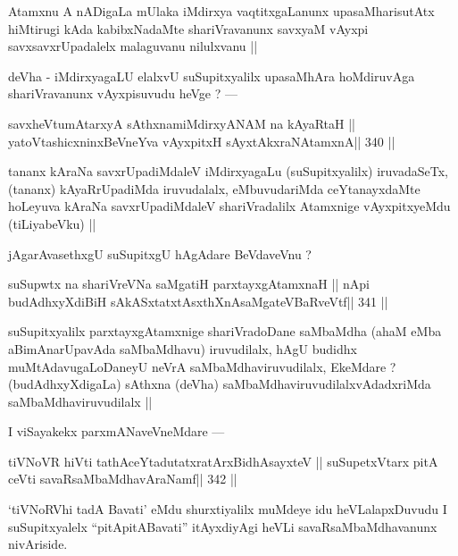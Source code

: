 \begin{artha}
Atamxnu A nADigaLa mUlaka iMdirxya vaqtitxgaLanunx upasaMharisutAtx 
hiMtirugi kAda kabibxNadaMte shariVravanunx savxyaM vAyxpi savxsavxrUpadalelx malaguvanu nilulxvanu ||
\end{artha}

\begin{artha}
deVha - iMdirxyagaLU elalxvU suSupitxyalilx upasaMhAra hoMdiruvAga shariVravanunx vAyxpisuvudu heVge ? ---
\end{artha}

\begin{shl}
savxheVtumAtarxyA sAthxnamiMdirxyANAM na kAyaRtaH ||
yatoV\s tashicxninxBeVneYva vAyxpitxH sAyxtAkxraNAtamxnA\hfill || 340 ||
\end{shl}

\begin{artha}
tananx kAraNa savxrUpadiMdaleV iMdirxyagaLu (suSupitxyalilx) 
iruvadaSeTx, (tananx) kAyaRrUpadiMda iruvudalalx, eMbuvudariMda ceYtanayxdaMte hoLeyuva kAraNa savxrUpadiMdaleV shariVradalilx Atamxnige vAyxpitxyeMdu (tiLiyabeVku) ||
\end{artha}

\begin{artha}
jAgarAvasethxgU suSupitxgU hAgAdare BeVdaveVnu ?
\end{artha}

\begin{shl}
suSupwtx na shariVreVNa saMgatiH parxtayxgAtamxnaH ||
nApi budAdhxyXdiBiH sAkASxtatxtAsxthXnAsaMgateVBaRveVtf\hfill || 341 ||
\end{shl}

\begin{artha}
suSupitxyalilx parxtayxgAtamxnige shariVradoDane saMbaMdha (ahaM eMba 
aBimAnarUpavAda saMbaMdhavu) iruvudilalx, hAgU budidhx 
muMtAdavugaLoDaneyU neVrA saMbaMdhaviruvudilalx, EkeMdare ? (budAdhxyXdigaLa) sAthxna (deVha) saMbaMdhaviruvudilalxvAdadxriMda saMbaMdhaviruvudilalx ||
\end{artha}

\begin{artha}
I viSayakekx parxmANaveVneMdare ---
\end{artha}

\begin{shl}
tiVNoVR hiVti tathAceYtadutatxratArxBidhAsayxteV ||
suSupetxV\s tarx pitA ceVti savaRsaMbaMdhavAraNamf\hfill || 342 ||
\end{shl}

\begin{artha}
`tiVNoRVhi tadA Bavati' eMdu shurxtiyalilx muMdeye idu heVLalapxDuvudu I suSupitxyalelx ``pitA\s pitABavati'' itAyxdiyAgi heVLi savaRsaMbaMdhavanunx nivAriside.
\end{artha}

